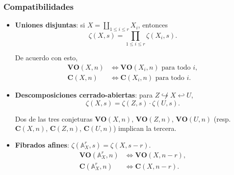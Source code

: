 \documentclass[handout]{beamer}
\renewcommand{\AA}{\mathbb{A}}
\begin{document}
\begin{frame}
  \frametitle{Compatibilidades}

  \begin{itemize}
  \item \textbf{Uniones disjuntas}: si
    $X = \coprod_{1 \le i \le r} X_i$, entonces
    \[ \zeta (X,s) = \prod_{1 \le i \le r} \zeta (X_i,s). \]

    De acuerdo con esto,
    \begin{align*}
      \mathbf{VO} (X,n) & \iff \mathbf{VO} (X_i,n)\text{ para todo }i, \\
      \mathbf{C} (X,n) & \iff \mathbf{C} (X_i,n)\text{ para todo }i.
    \end{align*}

  \item \textbf{Descomposiciones cerrado-abiertas}:
    para $Z \not\hookrightarrow X \hookleftarrow U$,
    \[ \zeta (X,s) = \zeta (Z,s) \cdot \zeta (U,s). \]

    Dos de las tres conjeturas
    $\mathbf{VO} (X,n)$, $\mathbf{VO} (Z,n)$, $\mathbf{VO} (U,n)$
    (resp. $\mathbf{C} (X,n)$, $\mathbf{C} (Z,n)$, $\mathbf{C} (U,n)$)
    implican la tercera.

  \item \textbf{Fibrados afines}:
    $\zeta (\AA^r_X, s) = \zeta (X, s-r)$.
    \begin{align*}
      \mathbf{VO} (\AA^r_X, n) & \iff \mathbf{VO} (X, n-r), \\
      \mathbf{C} (\AA^r_X, n) & \iff \mathbf{C} (X, n-r).
    \end{align*}
  \end{itemize}
\end{frame}

\end{document}
